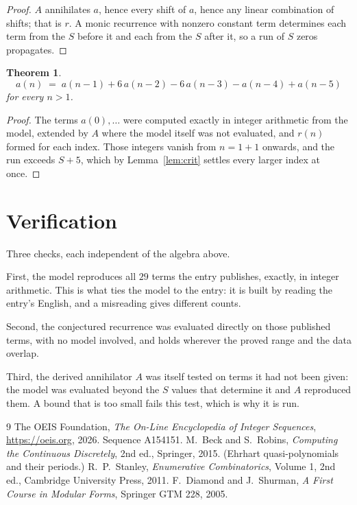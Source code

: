 \documentclass[11pt,a4paper]{article}
\theoremstyle{plain}
\newtheorem{theorem}{Theorem}
\theoremstyle{definition}
\begin{document}
\begin{proof}
$A$ annihilates $a$, hence every shift of $a$, hence any linear combination of shifts; that is
$r$. A monic recurrence with nonzero constant term determines each term from the $S$ before it
and each from the $S$ after it, so a run of $S$ zeros propagates.
\end{proof}

\begin{theorem}
\[
a(n)\;=\;a(n-1) + 6\,a(n-2) - 6\,a(n-3) - a(n-4) + a(n-5)
\]
for every $n>1$.
\end{theorem}

\begin{proof}
The terms $a(0),\dots$ were computed exactly in integer arithmetic from the model, extended by
$A$ where the model itself was not evaluated, and $r(n)$ formed for each index. Those integers
vanish from $n=1+1$ onwards, and the run exceeds $S+5$, which by
Lemma~\ref{lem:crit} settles every larger index at once.
\end{proof}

\section{Verification}

Three checks, each independent of the algebra above.

First, the model reproduces all $29$ terms the entry publishes, exactly, in integer
arithmetic. This is what ties the model to the entry: it is built by reading the entry's
English, and a misreading gives different counts.

Second, the conjectured recurrence was evaluated directly on those published terms, with no
model involved, and holds wherever the proved range and the data overlap.

Third, the derived annihilator $A$ was itself tested on terms it had not been given: the model
was evaluated beyond the $S$ values that determine it and $A$ reproduced them. A bound that is
too small fails this test, which is why it is run.

\begin{thebibliography}{9}
 The OEIS Foundation, \emph{The On-Line Encyclopedia of Integer
Sequences}, \url{https://oeis.org}, 2026. Sequence A154151.
 M.~Beck and S.~Robins, \emph{Computing the Continuous Discretely},
2nd ed., Springer, 2015. (Ehrhart quasi-polynomials and their periods.)
 R.~P.~Stanley, \emph{Enumerative Combinatorics}, Volume 1, 2nd ed.,
Cambridge University Press, 2011.
 F.~Diamond and J.~Shurman, \emph{A First Course in Modular Forms},
Springer GTM 228, 2005.
\end{thebibliography}
\end{document}
